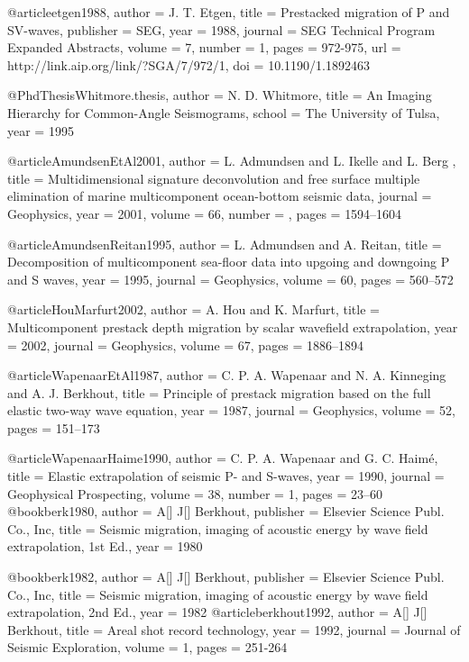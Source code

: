@article{etgen1988,
  author =	 {J. T. Etgen},
  title =	 {Prestacked migration of {P} and {S}{V}-waves},
  publisher =	 {SEG},
  year =	 1988,
  journal =	 {SEG Technical Program Expanded Abstracts},
  volume =	 7,
  number =	 1,
  pages =	 {972-975},
  url =		 {http://link.aip.org/link/?SGA/7/972/1},
  doi =		 {10.1190/1.1892463}
}

@PhdThesis{Whitmore.thesis,
  author =	 {N. D. Whitmore},
  title =	 {An Imaging Hierarchy for Common-Angle Seismograms},
  school =	 {The University of Tulsa},
  year =	 1995
}

@article{AmundsenEtAl2001,
author = {L. Admundsen and L. Ikelle and L. Berg },
title = {Multidimensional signature deconvolution and free surface multiple elimination of marine multicomponent ocean-bottom seismic data},
journal = {Geophysics},
year = {2001},
volume = {66},
number = {},
pages = {1594--1604}
}

@article{AmundsenReitan1995,
  author =	 {L. Admundsen and A. Reitan},
  title =	 {Decomposition of multicomponent sea-floor data into
                  upgoing and downgoing {P} and {S} waves},
  year =	 1995,
  journal =	 {Geophysics},
  volume =	 60,
  pages =	 {560--572}
}

@article{HouMarfurt2002,
  author =	 {A. Hou and K. Marfurt},
  title =	 {Multicomponent prestack depth migration by scalar
                  wavefield extrapolation},
  year =	 2002,
  journal =	 {Geophysics},
  volume =	 67,
  pages =	 {1886--1894}
}

@article{WapenaarEtAl1987,
  author =	 {C. P. A. Wapenaar and N. A. Kinneging and
                  A. J. Berkhout},
  title =	 {Principle of prestack migration based on the full
                  elastic two-way wave equation},
  year =	 1987,
  journal =	 {Geophysics},
  volume =	 52,
  pages =	 {151--173}
}

@article{WapenaarHaime1990,
  author =	 {C. P. A. Wapenaar and G. C. Haim\'{e}},
  title =	 {Elastic extrapolation of seismic {P}- and {S}-waves},
  year =	 1990,
  journal =	 {Geophysical Prospecting},
  volume =	 38,
  number =	 1,
  pages =	 {23--60}
}
@book{berk1980,
   author = {A[] J[] Berkhout},
   publisher = {Elsevier Science Publ. Co., Inc},
   title = {Seismic migration, imaging of acoustic energy by wave field extrapolation, 1st Ed.},
   year = {1980}
}

@book{berk1982,
   author = {A[] J[] Berkhout},
   publisher = {Elsevier Science Publ. Co., Inc},
   title = {Seismic migration, imaging of acoustic energy by wave field extrapolation, 2nd Ed.},
   year = {1982}
}
@article{berkhout1992,
  author =	 {A[] J[] Berkhout},
  title =	 {Areal shot record technology},
  year =	 1992,
  journal =	 {Journal of Seismic Exploration},
  volume =	 1,
  pages =	 {251-264}
}


